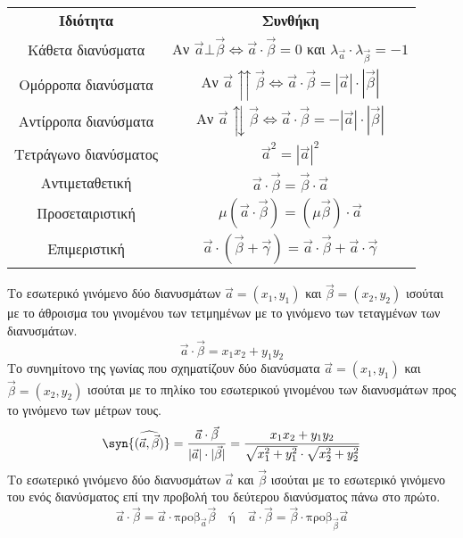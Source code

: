 \documentclass[twoside,nofonts,internet,shmeiwseis]{thewria}
\begin{document}
\begin{center}
\begin{longtable}{cc}
\hline \rule[-2ex]{0pt}{5.5ex} \textbf{Ιδιότητα} & \textbf{Συνθήκη} \\ 
\hhline{==}  \rule[-2ex]{0pt}{5.5ex} Κάθετα διανύσματα & Αν $ \vec{a}\bot\vec{\beta}\Leftrightarrow \vec{a}\cdot\vec{\beta}=0 $ και $ \lambda_{\vec{a}}\cdot\lambda_{\vec{\beta}}=-1 $ \\ 
 \rule[-2ex]{0pt}{5.5ex} Ομόρροπα διανύσματα & Αν $ \vec{a}\upuparrows\vec{\beta}\Leftrightarrow \vec{a}\cdot\vec{\beta}=|\vec{a}|\cdot|\vec{\beta}| $ \\ 
 \rule[-2ex]{0pt}{5.5ex} Αντίρροπα διανύσματα & Αν $ \vec{a}\updownarrows\vec{\beta}\Leftrightarrow \vec{a}\cdot\vec{\beta}=-|\vec{a}|\cdot|\vec{\beta}| $ \\ 
 \rule[-2ex]{0pt}{5.5ex} Τετράγωνο διανύσματος & $ \vec{a}^2=|\vec{a}|^2 $ \\ 
\rule[-2ex]{0pt}{5.5ex} Αντιμεταθετική & $ \vec{a}\cdot\vec{\beta}=\vec{\beta}\cdot\vec{a} $ \\
 \rule[-2ex]{0pt}{5.5ex} Προσεταιριστική & $ \mu(\vec{a}\cdot\vec{\beta})=(\mu\vec{\beta})\cdot\vec{a} $ \\
\rule[-2ex]{0pt}{5.5ex} Επιμεριστική & $ \vec{a}\cdot\left( \vec{\beta}+\vec{\gamma}\right) =\vec{a}\cdot\vec{\beta}+\vec{a}\cdot\vec{\gamma} $ \\
\hline 
\end{longtable} 
\end{center}
Το εσωτερικό γινόμενο δύο διανυσμάτων $ \vec{a}=(x_1,y_1) $ και $ \vec{\beta}=(x_2,y_2) $ ισούται με το άθροισμα του γινομένου των τετμημένων με το γινόμενο των τεταγμένων των διανυσμάτων.
\[ \vec{a}\cdot\vec{\beta}=x_1x_2+y_1y_2 \]
Το συνημίτονο της γωνίας που σχηματίζουν δύο διανύσματα $ \vec{a}=(x_1,y_1) $ και $ \vec{\beta}=(x_2,y_2) $ ισούται με το πηλίκο του εσωτερικού γινομένου των διανυσμάτων προς το γινόμενο των μέτρων τους.
\[ \syn{(\widehat{\vec{a},\vec{\beta}})}=\frac{\vec{a}\cdot\vec{\beta}}{|\vec{a}|\cdot|\vec{\beta}|}=\frac{x_1x_2+y_1y_2}{\sqrt{x_1^2+y_1^2}\cdot\sqrt{x_2^2+y_2^2}} \]
Το εσωτερικό γινόμενο δύο διανυσμάτων $ \vec{a} $ και $ \vec{\beta} $ ισούται με το εσωτερικό γινόμενο του ενός διανύσματος επί την προβολή του δεύτερου διανύσματος πάνω στο πρώτο.
\[ \vec{a}\cdot\vec{\beta}=\vec{a}\cdot\textrm{προβ}_{\vec{a}}{\vec{\beta}}\quad\textrm{ή}\quad\vec{a}\cdot\vec{\beta}=\vec{\beta}\cdot\textrm{προβ}_{\vec{\beta}}{\vec{a}} \]
\end{document}
